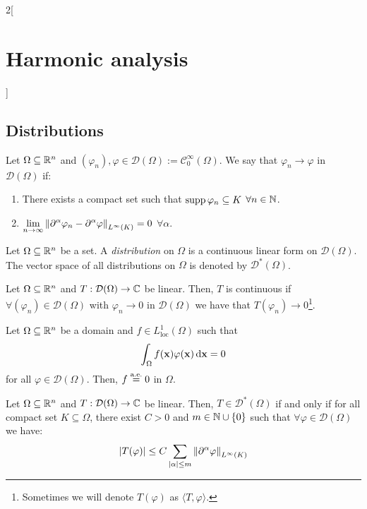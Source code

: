 \documentclass[../../../main_math.tex]{subfiles}
\begin{document}
\begin{multicols}{2}[\section{Harmonic analysis}]
  \subsection{Distributions}
  \begin{definition}
    Let $\Omega\subseteq \mathbb{R}^n$ and $(\varphi_n),\varphi\in\mathcal{D}(\Omega):=\mathcal{C}_0^\infty(\Omega)$. We say that $\varphi_n\rightarrow \varphi$ in $\mathcal{D}(\Omega)$ if:
    \begin{enumerate}
      \item There exists a compact set such that $\operatorname{supp} \varphi_n\subseteq K$ $\forall n\in\mathbb{N}$.
      \item $\displaystyle\lim_{n\to\infty}\left\|\partial^\alpha\varphi_n-\partial^\alpha\varphi\right\|_{L^\infty(K)}=0$ $\forall \alpha$.
    \end{enumerate}
  \end{definition}
  \begin{definition}[Distribution]
    Let $\Omega\subseteq \mathbb{R}^n$ be a set. A \emph{distribution} on $\Omega$ is a continuous linear form on $\mathcal{D}(\Omega)$. The vector space of all distributions on $\Omega$ is denoted by $\mathcal{D}^*(\Omega)$.
  \end{definition}
  \begin{lemma}
    Let $\Omega\subseteq\mathbb{R}^n$ and $T:\mathcal{D}(\Omega)\rightarrow\mathbb{C}$ be linear. Then, $T$ is continuous if $\forall (\varphi_n)\in\mathcal{D}(\Omega)$ with $\varphi_n\rightarrow 0$ in $\mathcal{D}(\Omega)$ we have that $T(\varphi_n)\rightarrow 0$\footnote{Sometimes we will denote $T(\varphi)$ as $\langle T,\varphi\rangle$.}.
  \end{lemma}
  \begin{lemma}\label{HA:fundamentallemma}
    Let $\Omega\subseteq\mathbb{R}^n$ be a domain and $f\in L_\mathrm{loc}^1(\Omega)$ such that $$\int_\Omega f(\boldsymbol{\mathrm{x}})\varphi(\boldsymbol{\mathrm{x}})\dd{\boldsymbol{\mathrm{x}}}=0$$ for all $\varphi\in\mathcal{D}(\Omega)$. Then, $f\overset{\text{a.e.}}{=}0$ in $\Omega$.
  \end{lemma}
  \begin{proposition}
    Let $\Omega\subseteq\mathbb{R}^n$ and $T:\mathcal{D}(\Omega)\rightarrow\mathbb{C}$ be linear. Then, $T\in \mathcal{D}^*(\Omega)$ if and only if for all compact set $K\subseteq \Omega$, there exist $C>0$ and $m\in\mathbb{N}\cup\{0\}$ such that $\forall \varphi\in\mathcal{D}(\Omega)$ we have:
    $$\abs{T(\varphi)}\leq C\sum_{\abs{\alpha}\leq m}\left\|\partial^\alpha\varphi\right\|_{L^\infty(K)}$$
  \end{proposition}

\end{multicols}
\end{document}
